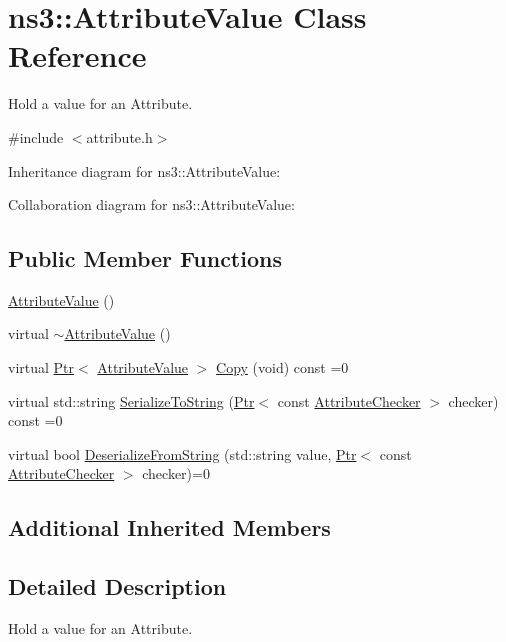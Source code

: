 \hypertarget{classns3_1_1AttributeValue}{}\section{ns3\+:\+:Attribute\+Value Class Reference}
\label{classns3_1_1AttributeValue}


Hold a value for an Attribute.  




{\ttfamily \#include $<$attribute.\+h$>$}



Inheritance diagram for ns3\+:\+:Attribute\+Value\+:


Collaboration diagram for ns3\+:\+:Attribute\+Value\+:
\subsection*{Public Member Functions}
\begin{DoxyCompactItemize}
\item 
\hyperlink{classns3_1_1AttributeValue_a5a77f37525d0b1727dd6f5320d04329d}{Attribute\+Value} ()
\item 
virtual \hyperlink{classns3_1_1AttributeValue_aa89c1058b46e1174a86f14d839a28346}{$\sim$\+Attribute\+Value} ()
\item 
virtual \hyperlink{classns3_1_1Ptr}{Ptr}$<$ \hyperlink{classns3_1_1AttributeValue}{Attribute\+Value} $>$ \hyperlink{classns3_1_1AttributeValue_ab316311212c334f6061c0fc8b5fb2625}{Copy} (void) const =0
\item 
virtual std\+::string \hyperlink{classns3_1_1AttributeValue_ace4b3a4e96ab0c46e0fdff15ed968fb1}{Serialize\+To\+String} (\hyperlink{classns3_1_1Ptr}{Ptr}$<$ const \hyperlink{classns3_1_1AttributeChecker}{Attribute\+Checker} $>$ checker) const =0
\item 
virtual bool \hyperlink{classns3_1_1AttributeValue_a20810988c236a9ead7867def557fe052}{Deserialize\+From\+String} (std\+::string value, \hyperlink{classns3_1_1Ptr}{Ptr}$<$ const \hyperlink{classns3_1_1AttributeChecker}{Attribute\+Checker} $>$ checker)=0
\end{DoxyCompactItemize}
\subsection*{Additional Inherited Members}


\subsection{Detailed Description}
Hold a value for an Attribute. 

